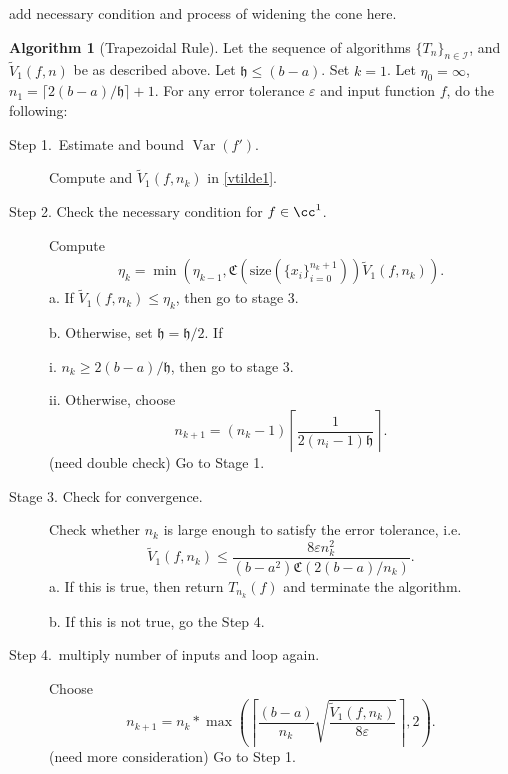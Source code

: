 \documentclass{iitthesis}
\DeclareMathOperator{\Var}{Var}
\theoremstyle{definition}
\newtheorem{algo}{Algorithm}
\theoremstyle{remark}
\begin{document}
add necessary condition and process of widening the cone here.


\begin{algo}[Trapezoidal Rule] \label{multistagetrapalgo}
Let the sequence of algorithms $\{T_n\}_{n\in \mathcal{I}}$, %
and $\widetilde{V}_1(f,n)$ be as described above.
Let $\mathfrak{h}\le (b-a)$. Set $k=1$. Let $\eta_{0}=\infty$, $n_1=\lceil2(b-a)/\mathfrak{h}\rceil+1$. For any error tolerance $\varepsilon$ and input function $f$, do the following:
\begin{description}
\item[Step 1.\ Estimate and bound {$\Var(f')$}.] Compute  and $\widetilde{V}_1(f,n_k)$ in \eqref{vtilde1}.

\item[Step 2. Check the necessary condition for $f \in \cc^1$.] Compute
    \begin{align*}
        \eta_{k}=\min\left(\eta_{k-1},\mathfrak{C}(\text{size}(\{x_i\}_{i=0}^{n_k+1}))\widetilde{V}_1(f,n_k)\right).
    \end{align*}
a. If $\widetilde{V}_1(f,n_k) \le \eta_{k}$, then go to stage 3.  

b. Otherwise, set $\mathfrak{h} = \mathfrak{h}/2$.  If

\vspace*{6mm} i. $n_k \ge 2(b-a)/\mathfrak{h}$, then go to stage 3.  

\indent ii. Otherwise, choose
$$n_{k+1}=(n_k-1)\left\lceil\frac{1}{2(n_i-1)\mathfrak{h}}\right\rceil.$$
(need double check)
Go to Stage 1.

\item[Stage 3. Check for convergence.] Check whether $n_k$ is large enough to satisfy the error tolerance, i.e.
    \begin{equation*}
        \widetilde{V}_1(f,n_k) \le \frac{8\varepsilon n_k^2}{(b-a^2)\mathfrak{C}(2(b-a)/n_k)}.
    \end{equation*}
a. If this is true, then return $T_{n_k}(f)$ and terminate the algorithm.   

b. If this is not true, go the Step 4. 

\item[Step 4.\ multiply number of inputs and loop again.] Choose
$$
n_{k+1}=n_k*\max\left(\left\lceil\frac{(b-a)}{n_{k}}\sqrt{\frac{\widetilde{V}_1(f,n_k)}{8\varepsilon}}\right\rceil,2\right).
$$
(need more consideration)
Go to Step 1.
\end{description}
\end{algo}
\end{document}
